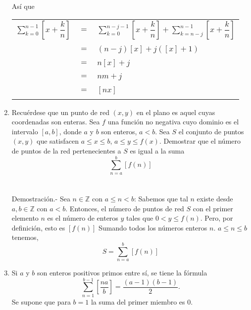 \begin{enumerate}[ \bfseries 1.]
\begin{center}
\begin{tabular}{cll}
	    \end{tabular}
	\end{center}
	Así que 
	\begin{center}
	    \begin{tabular}{rcl}
		$\sum\limits_{k=0}^{n-1} \left[x+\dfrac{k}{n}\right]$ & $=$ & $\sum\limits_{k=0}^{n-j-1} \left[x+\dfrac{k}{n}\right] + \sum\limits_{k=n-j}^{n-1} \left[x+\dfrac{k}{n}\right]$\\\\
		& $=$ & $(n-j)[x]+j([x]+1)$\\\\
		& $=$ & $n[x]+j$\\\\
		& $=$ & $nm+j$\\\\
		& $=$ & $[nx]$\\\\
	    \end{tabular}
	\end{center}

	\item Recuérdese que un punto de red $(x,y)$ en el plano es aquel cuyas coordenadas son enteras. Sea $f$ una función no negativa cuyo dominio es el intervalo $[a,b]$, donde $a$ y $b$ son enteros, $a<b$. Sea $S$ el conjunto de puntos $(x,y)$ que satisfacen $a\leq x\leq b$, $a\leq y \leq f(x)$. Demostrar que el número de puntos de la red pertenecientes a $S$ es igual a la suma $$\sum\limits_{n=a}^{b} \left[f(n)\right]$$\\\\
	    Demostración.-\; Sea $n\in \mathbb{Z}$ con $a\leq n < b$: Sabemos que tal $n$ existe desde $a,b \in \mathbb{Z}$ con $a<b$. Entonces, el número de puntos de red $S$ con el primer elemento $n$ es el número de enteros $y$ tales que $0<y\leq f(n)$. Pero, por definición, esto es $[f(n)]$ Sumando todos los números enteros $n$. $a\leq n\leq b$ tenemos, $$S=\sum\limits_{n=a}^{b} \left[f(n)\right]$$

	\item Si $a$ y $b$ son enteros positivos primos entre sí, se tiene la fórmula $$\sum\limits_{n=1}^{b-1} \left[\dfrac{na}{b}\right] = \dfrac{(a-1)(b-1)}{2}.$$ Se supone que para $b=1$ la suma del primer miembro es $0$.\\\\
	
	\begin{enumerate}[\bfseries (a)]


\end{enumerate}
\end{enumerate}

